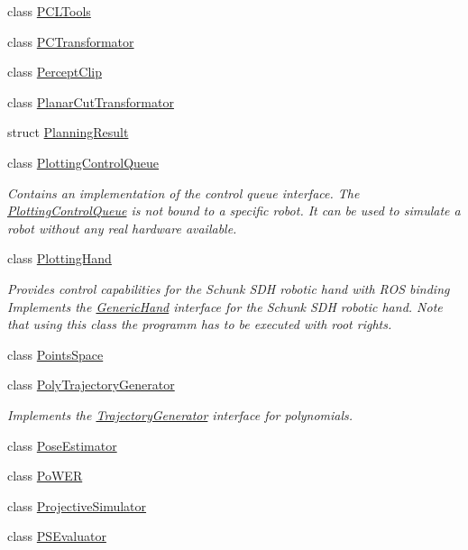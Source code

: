 \begin{DoxyCompactItemize}
\item 
class \hyperlink{classkukadu_1_1PCLTools}{P\+C\+L\+Tools}
\item 
class \hyperlink{classkukadu_1_1PCTransformator}{P\+C\+Transformator}
\item 
class \hyperlink{classkukadu_1_1PerceptClip}{Percept\+Clip}
\item 
class \hyperlink{classkukadu_1_1PlanarCutTransformator}{Planar\+Cut\+Transformator}
\item 
struct \hyperlink{structkukadu_1_1PlanningResult}{Planning\+Result}
\item 
class \hyperlink{classkukadu_1_1PlottingControlQueue}{Plotting\+Control\+Queue}
\begin{DoxyCompactList}\small\item\em Contains an implementation of the control queue interface. The \hyperlink{classkukadu_1_1PlottingControlQueue}{Plotting\+Control\+Queue} is not bound to a specific robot. It can be used to simulate a robot without any real hardware available. \end{DoxyCompactList}\item 
class \hyperlink{classkukadu_1_1PlottingHand}{Plotting\+Hand}
\begin{DoxyCompactList}\small\item\em Provides control capabilities for the Schunk S\+DH robotic hand with R\+OS binding Implements the \hyperlink{classkukadu_1_1GenericHand}{Generic\+Hand} interface for the Schunk S\+DH robotic hand. Note that using this class the programm has to be executed with root rights. \end{DoxyCompactList}\item 
class \hyperlink{classkukadu_1_1PointsSpace}{Points\+Space}
\item 
class \hyperlink{classkukadu_1_1PolyTrajectoryGenerator}{Poly\+Trajectory\+Generator}
\begin{DoxyCompactList}\small\item\em Implements the \hyperlink{classkukadu_1_1TrajectoryGenerator}{Trajectory\+Generator} interface for polynomials. \end{DoxyCompactList}\item 
class \hyperlink{classkukadu_1_1PoseEstimator}{Pose\+Estimator}
\item 
class \hyperlink{classkukadu_1_1PoWER}{Po\+W\+ER}
\item 
class \hyperlink{classkukadu_1_1ProjectiveSimulator}{Projective\+Simulator}
\item 
class \hyperlink{classkukadu_1_1PSEvaluator}{P\+S\+Evaluator}

\end{DoxyCompactItemize}
